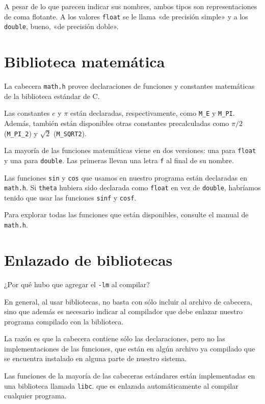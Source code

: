 A pesar de lo que parecen indicar sus nombres, ambos tipos son
representaciones de coma flotante. A los valores \lstinline!float! se le
llama «de precisión simple» y a los \lstinline!double!, bueno, «de
precisión doble».

\section{Biblioteca matemática}

La cabecera \lstinline!math.h! provee declaraciones de funciones y
constantes matemáticas de la biblioteca estándar de C.

Las constantes \(e\) y \(\pi\) están declaradas, respectivamente, como
\lstinline!M_E! y \lstinline!M_PI!. Además, también están disponibles
otras constantes precalculadas como \(\pi/2\) (\lstinline!M_PI_2!) y \(\sqrt 2\)
(\lstinline!M_SQRT2!).

La mayoría de las funciones matemáticas viene en dos versiones: una para
\lstinline!float! y una para \lstinline!double!. Las primeras llevan una
letra \lstinline!f! al final de su nombre.

Las funciones \lstinline!sin! y \lstinline!cos! que usamos en nuestro
programa están declaradas en \lstinline!math.h!. Si \lstinline!theta!
hubiera sido declarada como \lstinline!float! en vez de
\lstinline!double!, habríamos tenido que usar las funciones
\lstinline!sinf! y \lstinline!cosf!.

Para explorar todas las funciones que están disponibles, consulte el
manual de \lstinline!math.h!.

\section{Enlazado de bibliotecas}

¿Por qué hubo que agregar el \lstinline!-lm! al compilar?

En general, al usar bibliotecas, no basta con sólo incluir al archivo de
cabecera, sino que además es necesario indicar al compilador que debe
enlazar nuestro programa compilado con la biblioteca.

La razón es que la cabecera contiene sólo las declaraciones, pero no las
implementaciones de las funciones, que están en algún archivo ya
compilado que se encuentra instalado en alguna parte de nuestro sistema.

Las funciones de la mayoría de las cabeceras estándares están
implementadas en una biblioteca llamada \lstinline!libc!. que es
enlazada automáticamente al compilar cualquier programa.


